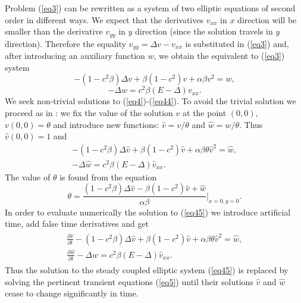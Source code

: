\documentclass[leqno,11pt]{book}
\newcommand{\rf}[1]{(\ref{#1})}
\begin{document}
Problem \rf{eq3} can be rewritten  as a  system of two elliptic equations of second order in different ways. We expect that  the derivatives $v_{xx}$ in $x $ direction  will be smaller than the derivative $v_{yy}$ in $y$ direction (since the solution travels in $y$ direction). Therefore the equality $v_{yy} = \Delta v- v_{xx}$ is substituted in \rf{eq3} and, after  introducing an auxiliary  function $w$, we obtain the equivalent to \rf{eq3} system
\begin{equation}\label{eq4}
- (1-c^2 \beta) \Delta v + \beta (1-c^2) v + \alpha \beta v^2 = w, 
\end{equation}
\begin{equation}\label{eq44}
 - \Delta w =  c^2 \beta (E- \Delta) v_{xx}. 
\end{equation}
We  seek  non-trivial solutions to \rf{eq4}-\rf{eq44}. To avoid the trivial solution we proceed as in \cite{Ch2012}: we fix the value of the solution $v$ at the point $(0,0)$,    $v(0,0)=\theta $ and introduce  new  functions: $\widehat{v}=v/{\theta} $ and $\widehat{w}=w/{\theta} $. Thus  
$ \widehat{v}(0,0)=1$ and 
\begin{equation}\label{eq45}
\begin{split}
 - (1-c^2 \beta) \Delta \widehat{v} + \beta (1-c^2) \widehat{v} + \alpha \beta \theta \widehat{v}^2 = \widehat{w}, \\
 - \Delta \widehat{w} =  c^2 \beta (E- \Delta) \widehat{v}_{xx}.\;\;\;\; \;\;\;\;  \;\;\;\;  \;\;\;\; 
\end{split}
\end{equation}
The value of $\theta $ is found from the  equation 
\begin{equation}\label{eqtheta}
\theta = \frac{ (1-c^2 \beta) \Delta \widehat{v} - \beta (1-c^2) \widehat{v} +\widehat{w}}{\alpha \beta} |_{x=0,y=0} .
\end{equation}
In order to evaluate numerically the solution to \rf{eq45} we introduce artificial time, add false  time derivatives and  get
\begin{align}\label{eq5}
\begin{split}
 \frac {\partial \widehat{v}}{\partial t} - (1-c^2 \beta) \Delta \widehat{v} + \beta (1-c^2) \widehat{v} + \alpha \beta \theta \widehat{v}^2 = \widehat{w}, \\
 \frac {\partial \widehat{w}}{\partial t} - \Delta \widehat{w} =  c^2 \beta (E- \Delta) \widehat{v}_{xx}. \;\;\;\;  \;\;\;\;  \;\;\;\;  \;\;\;\;
\end{split}
\end{align}
Thus the solution to the steady coupled elliptic system \rf{eq45} is replaced by   solving the  pertinent transient equations \rf{eq5} until their solutions $\widehat{v}$ and $\widehat{w}$ cease to change significantly in time. 
\end{document}
